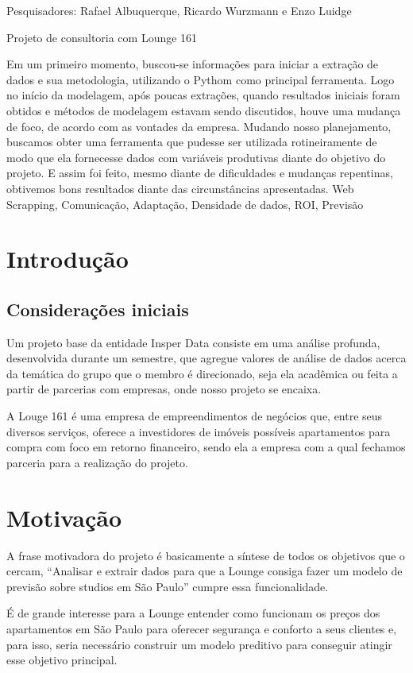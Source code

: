     {\noindent Pesquisadores:  Rafael Albuquerque, Ricardo Wurzmann e Enzo Luidge
    
    \noindent Projeto de consultoria com Lounge 161
    }
    {Em um primeiro momento, buscou-se informações para iniciar a extração de dados e sua metodologia, utilizando o Pythom como principal ferramenta. Logo no início da modelagem, após poucas extrações, quando resultados iniciais foram obtidos e métodos de modelagem estavam sendo discutidos, houve uma mudança de foco, de acordo com as vontades da empresa. Mudando nosso planejamento, buscamos obter uma ferramenta 
    que pudesse ser utilizada rotineiramente de modo que ela fornecesse dados com variáveis produtivas diante do objetivo do projeto. E assim foi feito, mesmo diante de dificuldades e mudanças repentinas, obtivemos bons resultados diante das circunstâncias apresentadas.}
    {Web Scrapping, Comunicação, Adaptação, Densidade de dados, ROI, Previsão
    }

\section*{Introdução}
\subsection*{Considerações iniciais}
Um projeto base da entidade Insper Data consiste em uma análise
profunda, desenvolvida durante um semestre, que agregue valores de análise 
de dados acerca da temática do grupo que o membro é direcionado, seja ela 
acadêmica ou feita a partir de parcerias com empresas, onde nosso projeto 
se encaixa.

A Louge 161 é uma empresa de empreendimentos 
de negócios que, entre seus diversos serviços, 
oferece a investidores de imóveis possíveis 
apartamentos para compra com foco em retorno 
financeiro, sendo ela a empresa com a qual 
fechamos parceria para a realização do projeto.

\section*{Motivação}
A frase motivadora do projeto é basicamente a síntese de todos os 
objetivos que o cercam, “Analisar e extrair dados para que a Lounge consiga 
fazer um modelo de previsão sobre studios em São Paulo” cumpre essa 
funcionalidade. 

É de grande interesse para a Lounge entender como funcionam os 
preços dos apartamentos em São Paulo para oferecer segurança e conforto a 
seus clientes e, para isso, seria necessário construir um modelo preditivo para 
conseguir atingir esse objetivo principal.

